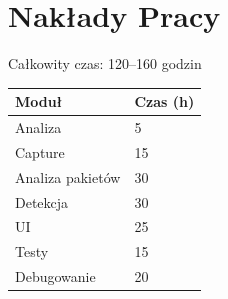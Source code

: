 \documentclass[a4paper,12pt]{article}
\begin{document}
	\section{Nakłady Pracy}
	Całkowity czas: 120--160 godzin
	
	\begin{longtable}{|l|l|}
		\hline
		Moduł & Czas (h) \\
		\hline
		Analiza & 5 \\
		Capture & 15 \\
		Analiza pakietów & 30 \\
		Detekcja & 30 \\
		UI & 25 \\
		Testy & 15 \\
		Debugowanie & 20 \\
		\hline
	\end{longtable}
	
\end{document}
